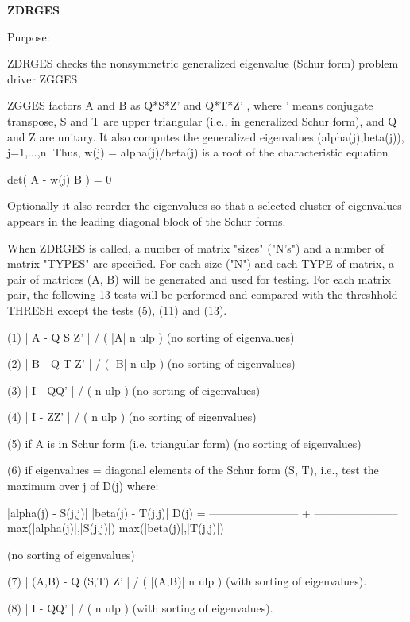 {\bfseries Z\+D\+R\+G\+E\+S} 

\begin{DoxyParagraph}{Purpose\+: }
\begin{DoxyVerb} ZDRGES checks the nonsymmetric generalized eigenvalue (Schur form)
 problem driver ZGGES.

 ZGGES factors A and B as Q*S*Z'  and Q*T*Z' , where ' means conjugate
 transpose, S and T are  upper triangular (i.e., in generalized Schur
 form), and Q and Z are unitary. It also computes the generalized
 eigenvalues (alpha(j),beta(j)), j=1,...,n.  Thus,
 w(j) = alpha(j)/beta(j) is a root of the characteristic equation

                 det( A - w(j) B ) = 0

 Optionally it also reorder the eigenvalues so that a selected
 cluster of eigenvalues appears in the leading diagonal block of the
 Schur forms.

 When ZDRGES is called, a number of matrix "sizes" ("N's") and a
 number of matrix "TYPES" are specified.  For each size ("N")
 and each TYPE of matrix, a pair of matrices (A, B) will be generated
 and used for testing. For each matrix pair, the following 13 tests
 will be performed and compared with the threshhold THRESH except
 the tests (5), (11) and (13).


 (1)   | A - Q S Z' | / ( |A| n ulp ) (no sorting of eigenvalues)


 (2)   | B - Q T Z' | / ( |B| n ulp ) (no sorting of eigenvalues)


 (3)   | I - QQ' | / ( n ulp ) (no sorting of eigenvalues)


 (4)   | I - ZZ' | / ( n ulp ) (no sorting of eigenvalues)

 (5)   if A is in Schur form (i.e. triangular form) (no sorting of
       eigenvalues)

 (6)   if eigenvalues = diagonal elements of the Schur form (S, T),
       i.e., test the maximum over j of D(j)  where:

                     |alpha(j) - S(j,j)|        |beta(j) - T(j,j)|
           D(j) = ------------------------ + -----------------------
                  max(|alpha(j)|,|S(j,j)|)   max(|beta(j)|,|T(j,j)|)

       (no sorting of eigenvalues)

 (7)   | (A,B) - Q (S,T) Z' | / ( |(A,B)| n ulp )
       (with sorting of eigenvalues).

 (8)   | I - QQ' | / ( n ulp ) (with sorting of eigenvalues).


\end{DoxyVerb}
\end{DoxyParagraph}
